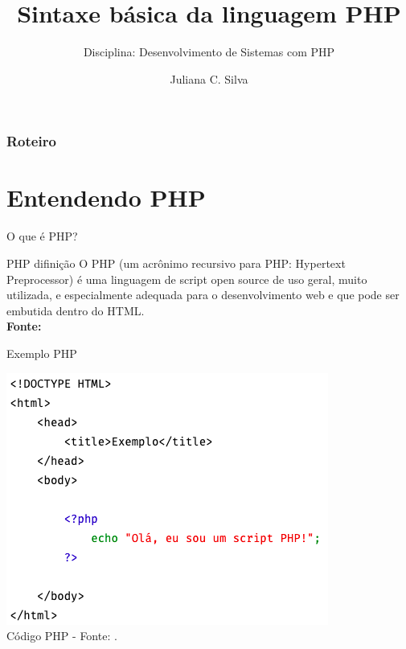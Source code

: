 \documentclass{beamer}
\title[Introdução ao PHP]{Sintaxe básica da linguagem PHP}
\subtitle{Disciplina: Desenvolvimento de Sistemas com PHP}
\author{Juliana C. Silva}
\institute{Universidade Positivo}
\begin{document}
\frame{\titlepage}
 
\begin{frame}
\frametitle{Roteiro} 
\tableofcontents 
\end{frame}
\section{Entendendo PHP}
\begin{frame}{O que é PHP?}
\begin{block}{PHP difinição}
O PHP (um acrônimo recursivo para PHP: Hypertext Preprocessor) é uma linguagem de script open source de uso geral, muito utilizada, e especialmente adequada para o desenvolvimento web e que pode ser embutida dentro do HTML.\\
\tiny{\textbf{Fonte:} \cite{achout2022php}}
\end{block}
\end{frame}
\begin{frame}{Exemplo PHP}
\begin{center}
		  \includegraphics[height=0.65\paperheight]{fig/aula4/php_aula4_1.png} \\
		  \tiny Código PHP - Fonte: \cite{achout2022php}.
	  \end{center}
    
\end{frame}
\end{document}
